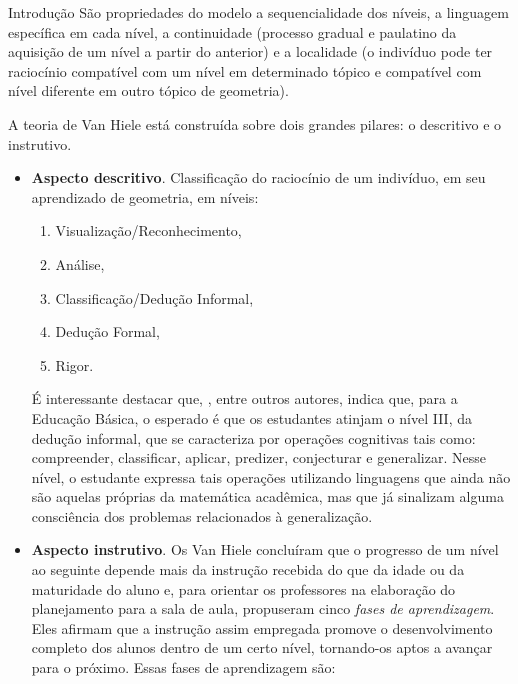\begin{apresentacao}{Introdução}
São propriedades do modelo a sequencialidade dos níveis, a linguagem específica em cada nível, a continuidade (processo gradual e paulatino da aquisição de um nível a partir do anterior) e a localidade (o indivíduo pode ter raciocínio compatível com um nível em determinado tópico e compatível com nível diferente em outro tópico de geometria).

A teoria de Van Hiele está construída sobre dois grandes pilares: o descritivo e o instrutivo.

\begin{itemize}
\item \textbf{Aspecto descritivo}. Classificação do raciocínio de um indivíduo, em seu aprendizado de geometria, em níveis:
\begin{enumerate}[label=\titem{\Roman*)}]
\item Visualização/Reconhecimento, 
\item Análise,
\item Classificação/Dedução Informal,
\item Dedução Formal,
\item Rigor. 
\end{enumerate}

É interessante destacar que, \citet{pastor1993}, entre outros autores, indica que, para a Educação Básica, o esperado é que os estudantes atinjam o nível III, da dedução informal, que se caracteriza por operações cognitivas tais como: compreender, classificar, aplicar, predizer, conjecturar e generalizar. Nesse nível, o estudante expressa tais operações utilizando linguagens que ainda não são aquelas próprias da matemática acadêmica, mas que já sinalizam alguma consciência dos problemas relacionados à generalização. 

\item \textbf{Aspecto instrutivo}. Os Van Hiele concluíram que o progresso de um nível ao seguinte depende mais da instrução recebida do que da idade ou da maturidade do aluno e, para orientar os professores na elaboração do planejamento para a sala de aula, propuseram cinco \textit{fases de aprendizagem}. Eles afirmam que a instrução assim empregada promove o desenvolvimento completo dos alunos dentro de um certo nível, tornando-os aptos a avançar para o próximo. 
Essas fases de aprendizagem são: 


\end{itemize}
\end{apresentacao}
